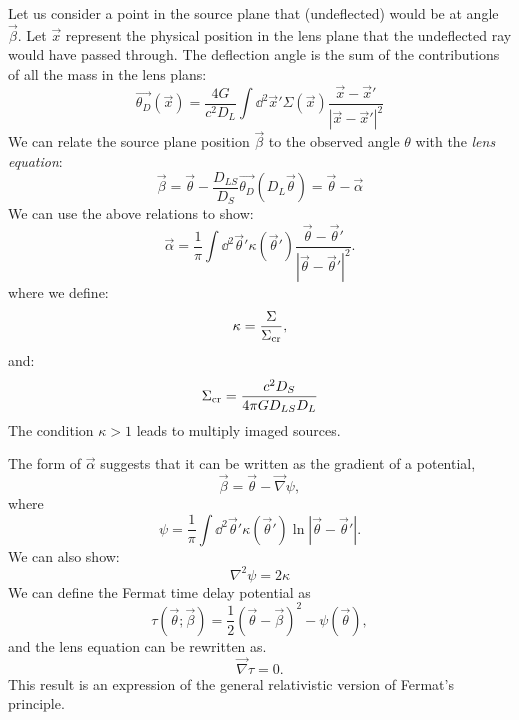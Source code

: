 Let us consider a point in the source plane that (undeflected) would
be at angle $\vec{\beta}$. Let $\vec{x}$ represent the physical
position in the lens plane that the undeflected ray would have passed
through.  The deflection angle is the sum of the contributions of all
the mass in the lens plans:
\begin{equation}
\vec{\theta_D}\left(\vec{x}\right) = \frac{4G}{c^2
D_L}  \int \dd^2 \vec{x}' \Sigma\left(\vec{x}\right) \frac{\vec{x}
- \vec{x}'}{\left|\vec{x} - \vec{x}'\right|^2}
\end{equation}
We can relate the source plane position $\vec{\beta}$ to the observed
angle $\theta$ with the {\it lens equation}:
\begin{equation}
\vec{\beta} = \vec{\theta}
- \frac{D_{LS}}{D_S} \vec{\theta_D}\left(D_L \vec{\theta}\right)
  = \vec{\theta} - \vec{\alpha}
\end{equation}
We can use the above relations to show:
\begin{equation}
\vec{\alpha}
= \frac{1}{\pi} \int \dd^2\vec{\theta}' \kappa\left(\vec{\theta}'\right)
\frac{\vec{\theta} - \vec{\theta}'}
{\left|\vec{\theta} - \vec{\theta}'\right|^2}.
\end{equation}
where we define:
\begin{equation}
\kappa = \frac{\Sigma}{\Sigma_{\rm cr}},
\end{equation}
and:
\begin{equation}
\Sigma_{\rm cr} = \frac{c^2 D_S}{4\pi G D_{LS} D_L}
\end{equation}
The condition $\kappa>1$ leads to multiply imaged sources.

The form of $\vec{\alpha}$ suggests that it can be written as the
gradient of a potential,
\begin{equation}
\vec{\beta} = \vec{\theta} - \vec{\nabla}\psi,
\end{equation}
where
\begin{equation}
\psi
= \frac{1}{\pi} \int \dd^2\vec{\theta}' \kappa\left(\vec{\theta}'\right)
\ln \left|\vec{\theta} - \vec{\theta}'\right|.
\end{equation}
We can also show:
\begin{equation}
\label{eq:poissonlike}
\nabla^2\psi = 2 \kappa
\end{equation}
We can define the Fermat time delay potential as
\begin{equation}
\tau\left(\vec{\theta}; \vec{\beta}\right) =
\frac{1}{2} \left(\vec{\theta} - \vec{\beta}\right)^2
- \psi\left(\vec{\theta}\right),
\end{equation}
and the lens equation can be rewritten as.
\begin{equation}
\vec{\nabla}\tau = 0.
\end{equation}
This result is an expression of the general relativistic version of
Fermat's principle.

